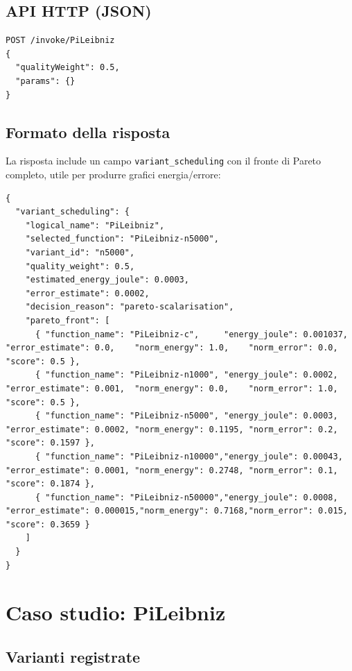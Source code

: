 \documentclass[a4paper,12pt]{article}
\begin{document}
\subsection{API HTTP (JSON)}

\begin{lstlisting}[style=json, caption={Corpo della richiesta HTTP}]
POST /invoke/PiLeibniz
{
  "qualityWeight": 0.5,
  "params": {}
}
\end{lstlisting}

\subsection{Formato della risposta}

La risposta include un campo \texttt{variant\_scheduling} con il fronte
di Pareto completo, utile per produrre grafici energia/errore:

\begin{lstlisting}[style=json, caption={Estratto della risposta JSON}]
{
  "variant_scheduling": {
    "logical_name": "PiLeibniz",
    "selected_function": "PiLeibniz-n5000",
    "variant_id": "n5000",
    "quality_weight": 0.5,
    "estimated_energy_joule": 0.0003,
    "error_estimate": 0.0002,
    "decision_reason": "pareto-scalarisation",
    "pareto_front": [
      { "function_name": "PiLeibniz-c",     "energy_joule": 0.001037, "error_estimate": 0.0,    "norm_energy": 1.0,    "norm_error": 0.0,   "score": 0.5 },
      { "function_name": "PiLeibniz-n1000", "energy_joule": 0.0002,   "error_estimate": 0.001,  "norm_energy": 0.0,    "norm_error": 1.0,   "score": 0.5 },
      { "function_name": "PiLeibniz-n5000", "energy_joule": 0.0003,   "error_estimate": 0.0002, "norm_energy": 0.1195, "norm_error": 0.2,   "score": 0.1597 },
      { "function_name": "PiLeibniz-n10000","energy_joule": 0.00043,  "error_estimate": 0.0001, "norm_energy": 0.2748, "norm_error": 0.1,   "score": 0.1874 },
      { "function_name": "PiLeibniz-n50000","energy_joule": 0.0008,   "error_estimate": 0.000015,"norm_energy": 0.7168,"norm_error": 0.015, "score": 0.3659 }
    ]
  }
}
\end{lstlisting}

\section{Caso studio: PiLeibniz}

\subsection{Varianti registrate}
\end{document}
